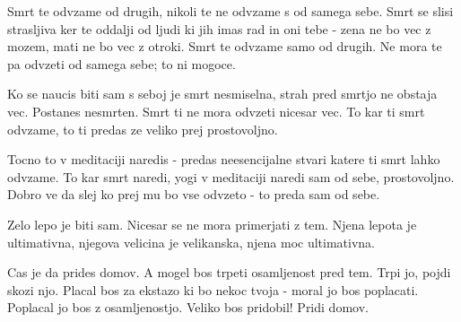 Smrt te odvzame od drugih, nikoli te ne odvzame s od samega sebe. Smrt se slisi strasljiva ker te oddalji od ljudi ki jih imas rad in oni tebe - zena ne bo vec z mozem, mati ne bo vec z otroki. Smrt te odvzame samo od drugih. Ne mora te pa odvzeti od samega sebe; to ni mogoce. 

Ko se naucis biti sam s seboj je smrt nesmiselna, strah pred smrtjo ne obstaja vec. Postanes nesmrten. Smrt ti ne mora odvzeti nicesar vec. To kar ti smrt odvzame, to ti predas ze veliko prej prostovoljno. 

Tocno to v meditaciji naredis - predas neesencijalne stvari katere ti smrt lahko odvzame. To kar smrt naredi, yogi v meditaciji naredi sam od sebe, prostovoljno. Dobro ve da slej ko prej mu bo vse odvzeto - to preda sam od sebe. 

Zelo lepo je biti sam. Nicesar se ne mora primerjati z tem. Njena lepota je ultimativna, njegova velicina je velikanska, njena moc ultimativna. 

Cas je da prides domov. A mogel bos trpeti osamljenost pred tem. Trpi jo, pojdi skozi njo. Placal bos za ekstazo ki bo nekoc tvoja - moral jo bos poplacati. Poplacal jo bos z osamljenostjo. Veliko bos pridobil! Pridi domov. 